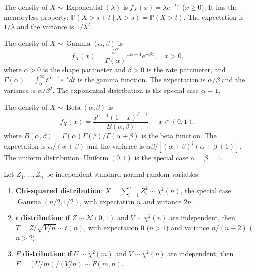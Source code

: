 \begin{definition}\label{def:exponential_distribution}
The density of $X \sim \operatorname{Exponential}(\lambda)$ is $f_X(x) = \lambda e^{-\lambda x}$ ($x \ge 0$). It has the memoryless property: $\mathbb{P}(X > s + t \mid X > s) = \mathbb{P}(X > t)$. The expectation is $1/\lambda$ and the variance is $1/\lambda^2$.
\end{definition}

\begin{definition}\label{def:gamma_distribution}
The density of $X \sim \operatorname{Gamma}(\alpha, \beta)$ is
\[
f_X(x) = \frac{\beta^\alpha}{\Gamma(\alpha)} x^{\alpha-1} e^{-\beta x}, \quad x > 0,
\]
where $\alpha > 0$ is the shape parameter and $\beta > 0$ is the rate parameter, and $\Gamma(\alpha) = \int_0^\infty t^{\alpha-1} e^{-t} dt$ is the gamma function. The expectation is $\alpha/\beta$ and the variance is $\alpha/\beta^2$. The exponential distribution is the special case $\alpha = 1$.
\end{definition}

\begin{definition}\label{def:beta_distribution}
The density of $X \sim \operatorname{Beta}(\alpha, \beta)$ is
\[
f_X(x) = \frac{x^{\alpha-1} (1-x)^{\beta-1}}{B(\alpha, \beta)}, \quad x \in (0, 1),
\]
where $B(\alpha, \beta) = \Gamma(\alpha)\Gamma(\beta)/\Gamma(\alpha+\beta)$ is the beta function. The expectation is $\alpha/(\alpha+\beta)$ and the variance is $\alpha\beta/[(\alpha+\beta)^2(\alpha+\beta+1)]$. The uniform distribution $\operatorname{Uniform}(0,1)$ is the special case $\alpha = \beta = 1$.
\end{definition}

\begin{definition}\label{def:chi2_t_f}
Let $Z_1, \dots, Z_n$ be independent standard normal random variables.
\begin{enumerate}[label=(\roman*)]
    \item \textbf{Chi-squared distribution}: $X = \sum_{i=1}^n Z_i^2 \sim \chi^2(n)$, the special case $\operatorname{Gamma}(n/2, 1/2)$, with expectation $n$ and variance $2n$.
    \item \textbf{$t$ distribution}: if $Z \sim \mathcal{N}(0,1)$ and $V \sim \chi^2(n)$ are independent, then $T = Z/\sqrt{V/n} \sim t(n)$, with expectation $0$ ($n > 1$) and variance $n/(n-2)$ ($n > 2$).
    \item \textbf{$F$ distribution}: if $U \sim \chi^2(m)$ and $V \sim \chi^2(n)$ are independent, then $F = (U/m)/(V/n) \sim F(m, n)$.
\end{enumerate}
\end{definition}

